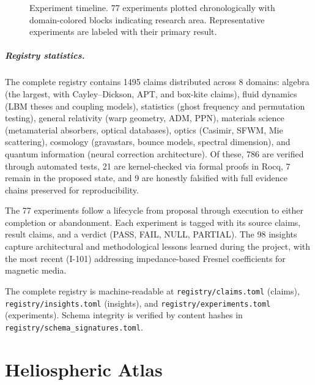 \documentclass[12pt,openany]{report}
\theoremstyle{definition}
\theoremstyle{plain}
\theoremstyle{remark}
\newcommand{\claimcount}{1495}
\begin{document}
\begin{figure}[htbp]
\centering

\caption{Experiment timeline.  77 experiments plotted
chronologically with domain-colored blocks indicating research area.
Representative experiments are labeled with their primary result.}
\label{fig:experiment-timeline}
\end{figure}

\paragraph{Registry statistics.}
The complete registry contains \claimcount{} claims distributed across
8 domains: algebra (the largest, with Cayley--Dickson, APT, and box-kite
claims), fluid dynamics (LBM theses and coupling models), statistics
(ghost frequency and permutation testing), general relativity (warp
geometry, ADM, PPN), materials science (metamaterial absorbers, optical
databases), optics (Casimir, SFWM, Mie scattering), cosmology
(gravastars, bounce models, spectral dimension), and quantum information
(neural correction architecture).  Of these, 786 are verified through
automated tests, 21 are kernel-checked via formal proofs in Rocq, 7
remain in the proposed state, and 9 are honestly falsified with full
evidence chains preserved for reproducibility.

The 77 experiments follow a lifecycle from proposal through execution
to either completion or abandonment.  Each experiment is tagged with
its source claims, result claims, and a verdict (PASS, FAIL, NULL,
PARTIAL).  The 98 insights capture architectural and methodological
lessons learned during the project, with the most recent (I-101)
addressing impedance-based Fresnel coefficients for magnetic media.

The complete registry is machine-readable at
\texttt{registry/claims.toml} (claims),
\texttt{registry/insights.toml} (insights), and
\texttt{registry/experiments.toml} (experiments).
Schema integrity is verified by content hashes in
\texttt{registry/schema\_signatures.toml}.


\chapter{Heliospheric Atlas}
\label{ch:heliospheric-atlas}
\end{document}

